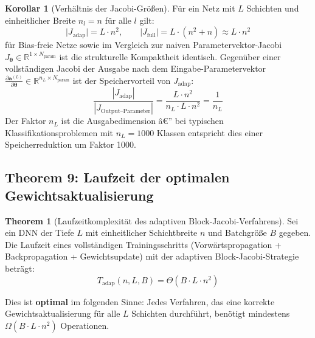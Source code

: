 ﻿\documentclass[a4paper,12pt]{article}
\theoremstyle{definition}
\newtheorem{korollar}{Korollar}
\newtheorem{theorem}{Theorem}
\begin{document}
\begin{korollar}[Verhältnis der Jacobi-Größen]
	\label{cor:size_ratio}
	Für ein Netz mit $L$ Schichten und einheitlicher Breite $n_l = n$ für alle $l$ gilt:
	\[
	\bigl|J_{\mathrm{adap}}\bigr| = L \cdot n^2, \qquad
	\bigl|J_{\mathrm{full}}\bigr| = L \cdot (n^2 + n) \approx L \cdot n^2
	\]
	für Bias-freie Netze sowie im Vergleich zur naiven Parametervektor-Jacobi $J_{\boldsymbol{\theta}} \in \mathbb{R}^{1 \times N_{\mathrm{param}}}$ ist die strukturelle Kompaktheit identisch. Gegenüber einer vollständigen Jacobi der Ausgabe nach dem Eingabe-Parametervektor $\frac{\partial \boldsymbol{a}^{(L)}}{\partial \boldsymbol{\theta}} \in \mathbb{R}^{n_L \times N_{\mathrm{param}}}$ ist der Speichervorteil von $J_{\mathrm{adap}}$:
	\[
	\frac{|J_{\mathrm{adap}}|}{|J_{\text{Output--Parameter}}|} = \frac{L \cdot n^2}{n_L \cdot L \cdot n^2} = \frac{1}{n_L}
	\]
	Der Faktor $n_L$ ist die Ausgabedimension â€” bei typischen Klassifikationsproblemen mit $n_L = 1000$ Klassen entspricht dies einer Speicherreduktion um Faktor 1000.
\end{korollar}

\subsection{Theorem 9: Laufzeit der optimalen Gewichtsaktualisierung}

\begin{theorem}[Laufzeitkomplexität des adaptiven Block-Jacobi-Verfahrens]
	\label{thm:runtime}
	Sei ein DNN der Tiefe $L$ mit einheitlicher Schichtbreite $n$ und Batchgröße $B$ gegeben. Die Laufzeit eines vollständigen Trainingsschritts (Vorwärtspropagation + Backpropagation + Gewichtsupdate) mit der adaptiven Block-Jacobi-Strategie beträgt:
	\[
	T_{\mathrm{adap}}(n, L, B) = \Theta(B \cdot L \cdot n^2)
	\]
	
	Dies ist \textbf{optimal} im folgenden Sinne: Jedes Verfahren, das eine korrekte Gewichtsaktualisierung für alle $L$ Schichten durchführt, benötigt mindestens $\Omega(B \cdot L \cdot n^2)$ Operationen.
\end{theorem}
\end{document}
